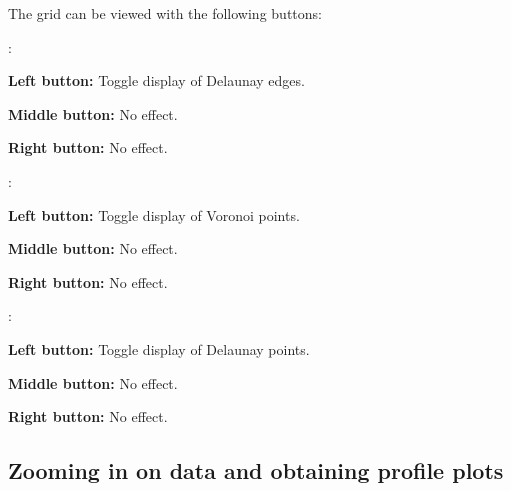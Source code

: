 The grid can be viewed with the following buttons:
\begin{list}{}
\item {}:
\begin{list}{}
\item {\bf Left button:} Toggle display of Delaunay edges.
\item {\bf Middle button:} No effect.
\item {\bf Right button:} No effect.
\end{list}
\item {}:
\begin{list}{}
\item {\bf Left button:} Toggle display of Voronoi points.
\item {\bf Middle button:} No effect.
\item {\bf Right button:} No effect.
\end{list}
\item {}:
\begin{list}{}
\item {\bf Left button:} Toggle display of Delaunay points.
\item {\bf Middle button:} No effect.
\item {\bf Right button:} No effect.
\end{list}
\end{list}

\subsection{Zooming in on data and obtaining profile plots}

